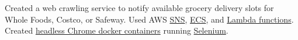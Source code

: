 {Created a web crawling service to notify available grocery delivery slots for Whole Foods, Costco, or Safeway. Used AWS \href{https://aws.amazon.com/sns/}{SNS}, \href{https://aws.amazon.com/ecs/}{ECS}, and \href{https://docs.aws.amazon.com/lambda/index.html}{Lambda functions}. Created \href{https://hub.docker.com/r/browserless/chrome/}{headless Chrome docker containers} running \href{https://www.selenium.dev/}{Selenium}.}
